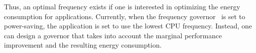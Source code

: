 Thus, an optimal frequency exists if one is interested
in optimizing the energy consumption for applications. Currently, when the frequency governor~\cite{ad-governors} is set to power-saving, the application is set to use the lowest CPU frequency. Instead, one can design a governor that takes into account the marginal performance improvement and the resulting energy consumption. 

